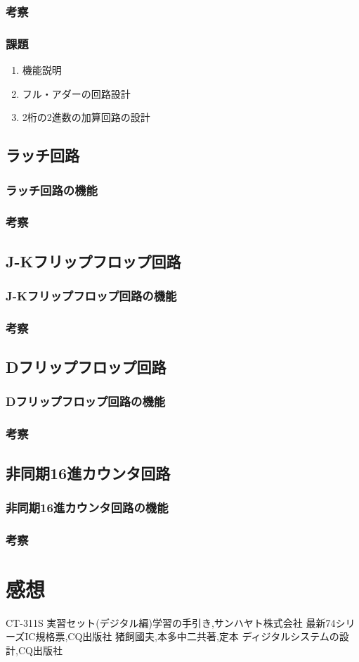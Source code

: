 \documentclass[twocolumn, 10pt,a4j]{jsarticle}
\begin{document}
  \subsubsection{考察}
  \subsubsection{課題}
    \begin{enumerate}
    \item 機能説明
    \item フル・アダーの回路設計
    \item 2桁の2進数の加算回路の設計
    \end{enumerate}
\subsection{ラッチ回路}
  \subsubsection{ラッチ回路の機能}
  \subsubsection{考察}
\subsection{J-Kフリップフロップ回路}
  \subsubsection{J-Kフリップフロップ回路の機能}
  \subsubsection{考察}
\subsection{Dフリップフロップ回路}
  \subsubsection{Dフリップフロップ回路の機能}
  \subsubsection{考察}
\subsection{非同期16進カウンタ回路}
  \subsubsection{非同期16進カウンタ回路の機能}
  \subsubsection{考察}
\section{感想}


\begin{thebibliography}{3}
\bibitem{}CT-311S 実習セット(デジタル編)学習の手引き,サンハヤト株式会社
\bibitem{}最新74シリーズIC規格票,CQ出版社
\bibitem{}猪飼國夫,本多中二共著,定本 ディジタルシステムの設計,CQ出版社
\end{thebibliography}
\end{document}
